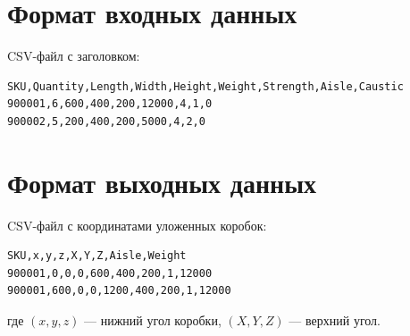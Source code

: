\section{Формат входных данных}

CSV-файл с заголовком:
\begin{verbatim}
SKU,Quantity,Length,Width,Height,Weight,Strength,Aisle,Caustic
900001,6,600,400,200,12000,4,1,0
900002,5,200,400,200,5000,4,2,0
\end{verbatim}

\section{Формат выходных данных}

CSV-файл с координатами уложенных коробок:
\begin{verbatim}
SKU,x,y,z,X,Y,Z,Aisle,Weight
900001,0,0,0,600,400,200,1,12000
900001,600,0,0,1200,400,200,1,12000
\end{verbatim}

где $(x, y, z)$ --- нижний угол коробки, $(X, Y, Z)$ --- верхний угол.
